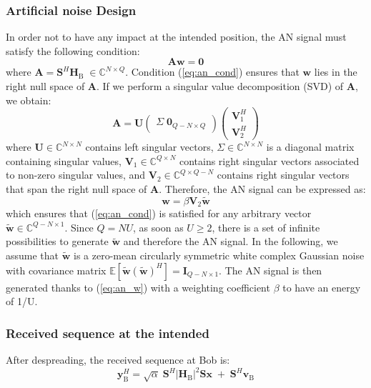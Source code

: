 \documentclass[journal,comsoc]{IEEEtran}
\newcommand{\module}[1]{\left|#1\right|}
\newcommand{\EX}[1]{\mathbb{E} \left[#1\right]}%
\newcommand{\HB}{\textbf{H}_{\text{B}}}
\newcommand{\spread}{\textbf{S}}
\newcommand{\w}{\textbf{w}}
\newcommand{\C}{\mathbb{C}}
\begin{document}
%
\subsubsection{Artificial noise Design}
In order not to have any impact at the intended position, the AN signal must satisfy the following condition:
\begin{equation}
\textbf{A} \w \; = \; \textbf{0}
\label{eq:an_cond}
\end{equation}
where $\textbf{A} = \spread^H\HB\; \in \C^{N\times Q}$. Condition (\ref{eq:an_cond}) ensures that $\w$ lies in the right null space of $\textbf{A}$. If we perform a singular value decomposition (SVD) of $\textbf{A}$, we obtain:
\begin{equation}
\textbf{A} = \textbf{U} 
\begin{pmatrix}
\Sigma \; \textbf{0}_{Q-N\times Q}
\end{pmatrix}
\begin{pmatrix}
\textbf{V}_1^H \\
\textbf{V}_2^H
\end{pmatrix}
\label{eq:an_svd}
\end{equation}
where $\textbf{U} \in \C^{N \times N}$ contains left singular vectors, $\Sigma \in \C^{N \times N}$ is a diagonal matrix containing singular values, $\textbf{V}_1 \in \C^{Q \times N}$ contains right singular vectors associated to non-zero singular values, and $\textbf{V}_2 \in \C^{Q \times Q-N}$ contains right singular vectors that span the right null space of $\textbf{A}$. Therefore, the AN signal can be expressed as:
\begin{equation}
\w = \beta \textbf{V}_2 \tilde{\w}
\label{eq:an_w}
\end{equation}
which ensures that (\ref{eq:an_cond}) is satisfied for any arbitrary vector $\tilde{\w} \in \C^{Q-N \times 1}$. Since $Q = NU$, as soon as $U\geq 2$, there is a set of infinite possibilities to generate $\tilde{\w}$ and therefore the AN signal. In the following, we assume that $\tilde{\w}$ is a zero-mean circularly symmetric white complex Gaussian noise with covariance matrix $\EX{\tilde{\w}(\tilde{\w})^H} = \textbf{I}_{Q-N \times 1}$. The AN signal is then generated thanks to (\ref{eq:an_w}) with a weighting coefficient $\beta$ to have an energy of 1/U.


\subsubsection{Received sequence at the intended }
After despreading, the received sequence at Bob is: 
\begin{equation}
\textbf{y}_{\text{B}}^H = \sqrt{\alpha} \; \spread^H \module{\HB}^2 \spread \textbf{x} \;  +  \;  \spread^H \textbf{v}_\text{B} 
\label{eq:rx_bob_AN}
\end{equation}
\end{document}
